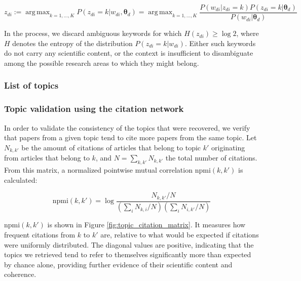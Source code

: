 \documentclass{article}
\DeclareMathOperator*{\argmax}{arg\,max}
\begin{document}
\begin{equation}
    z_{di} := \argmax_{k=1,\dots,K} P(z_{di}=k|w_{di},\bm{\theta}_{d}) =  \argmax_{k=1,\dots,K} \dfrac{P(w_{di}|z_{di}=k)P(z_{di}=k|\bm{\theta}_d)}{P(w_{di}|\bm{\theta}_d)}
\end{equation}

In the process, we discard ambiguous keywords for which $H(z_{di})\geq \log{2}$, where $H$ denotes the entropy of the distribution $P(z_{di}=k|w_{di})$. Either such keywords do not carry any scientific content, or the context is insufficient to disambiguate among the possible research areas to which they might belong.

\subsubsection{List of topics}

\fontsize{6}{7}\selectfont\normalsize

\subsubsection{\label{appendix:citation_validation}Topic validation using the citation network}

In order to validate the consistency of the topics that were recovered, we verify that papers from a given topic tend to cite more papers from the same topic. Let $N_{k,k'}$ be the amount of citations of articles that belong to topic $k'$ originating from articles that belong to $k$, and $N=\sum_{k,k'}N_{k,k'}$ the total number of citations. From this matrix, a normalized pointwise mutual correlation $\mathrm{npmi}(k,k')$ is calculated:

\begin{equation}
    \mathrm{npmi}(k,k') = \log {\dfrac{N_{k,k'}/N}{(\sum_{i} N_{k,i}/N)(\sum_{i} N_{i,k'}/N)}}
\end{equation}

$\mathrm{npmi}(k,k')$ is shown in Figure \ref{fig:topic_citation_matrix}. It measures how frequent citations from $k$ to $k'$ are, relative to what would be expected if citations were uniformly distributed. The diagonal values are positive, indicating that the topics we retrieved tend to refer to themselves significantly more than expected by chance alone, providing further evidence of their scientific content and coherence.
\end{document}
